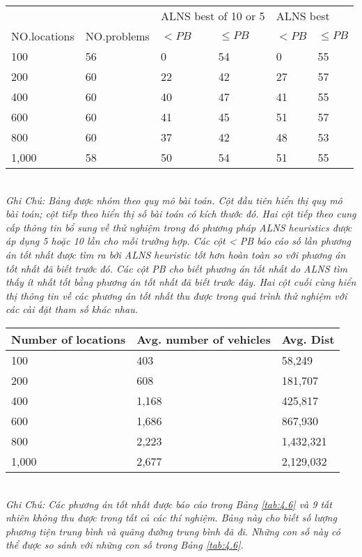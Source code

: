 
\begin{table}[caption={So sánh với những phương pháp tốt nhất hiện có}, label=tab:4.8]
    \begin{tabular}{llllll}
        \toprule
         & & \multicolumn{2}{l}{\footnotesize{ALNS best of 10 or 5}} & \multicolumn{2}{l}{\footnotesize{ALNS best}} \\
         \scriptsize{NO.locations} &\scriptsize{NO.problems} &\scriptsize{$< PB$}  &\scriptsize{$\leq PB$} &\scriptsize{$< PB$}  &\scriptsize{$\leq PB$} \\
         \midrule
         100   & 56 & 0  & 54 & 0  & 55 \\
         200   & 60 & 22 & 42 & 27 & 57 \\
         400   & 60 & 40 & 47 & 41 & 55 \\
         600   & 60 & 41 & 45 & 51 & 57 \\
         800   & 60 & 37 & 42 & 48 & 53 \\
         1,000 & 58 & 50 & 54 & 51 & 55  \\
    \end{tabular} \\
    \justify
    \textit{Ghi Chú: Bảng được nhóm theo quy mô bài toán. Cột đầu tiên hiển thị quy mô bài toán; cột tiếp theo hiển thị số bài toán có kích thước đó. Hai cột tiếp theo cung cấp thông tin bổ sung về thử nghiệm trong đó phương pháp ALNS heuristics được áp dụng 5 hoặc 10 lần cho mỗi trường hợp. Các cột < PB báo cáo số lần phương án tốt nhất được tìm ra bởi ALNS heuristic tốt hơn hoàn toàn so với phương án tốt nhất đã biết trước đó. Các cột PB cho biết phương án tốt nhất do ALNS tìm thấy ít nhất tốt bằng phương án tốt nhất đã biết trước đây. Hai cột cuối cùng hiển thị thông tin về các phương án tốt nhất thu được trong quá trình thử nghiệm với các cài đặt tham số khác nhau.}
\end{table}


\begin{table}[caption={Hiệu suất trung bình của ALNS Heuristic}, label=tab:4.9]
    \begin{tabular}{lll}
        \toprule
        Number of locations& Avg. number of vehicles & Avg. Dist \\ \midrule
    100 & 403 & 58,249   \\
    200 & 608 & 181,707   \\
    400 & 1,168 & 425,817  \\
    600 & 1,686 & 867,930   \\
    800 & 2,223 & 1,432,321  \\
    1,000 & 2,677 & 2,129,032 \\
    \end{tabular} \\
    \justify
    \textit{Ghi Chú: Các phương án tốt nhất được báo cáo trong Bảng \ref{tab:4.6} và 9 tất nhiên không thu được trong tất cả các thí nghiệm. Bảng này cho biết số lượng phương tiện trung bình và quãng đường trung bình đã đi. Những con số này có thể được so sánh với những con số trong Bảng \ref{tab:4.6}.}
\end{table}

